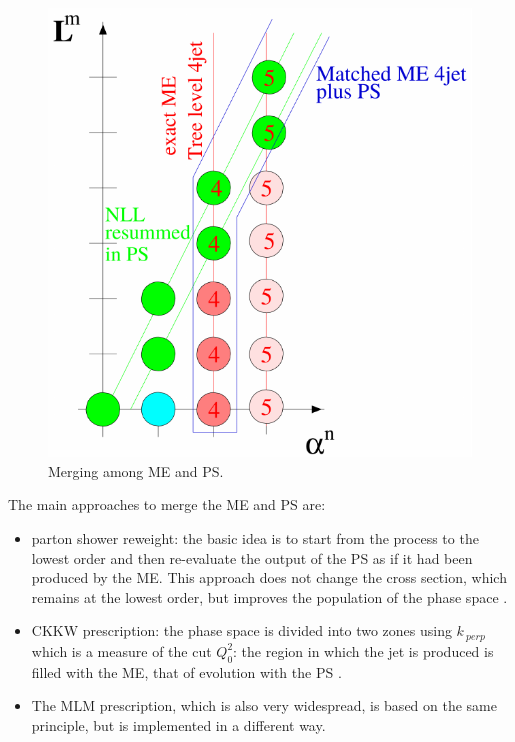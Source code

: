 \begin{figure}
\centering
\includegraphics[scale= 0.7]{../Cap3/Fig_MC/merge}
\caption{ Merging among ME and PS.}
\label{merge}
\end{figure}
The main approaches to merge the  ME and PS are:
\begin{itemize}
\item  parton shower reweight: the basic idea is to start from the process to the lowest order and then re-evaluate the output of the PS as if it had been produced by the ME. This approach does not change the cross section, which remains at the lowest order, but improves the population of the phase space \cite{ripesamento, ripesamento2}.
\item  CKKW prescription: the phase space is divided into two zones using $ k _ {\ perp} $ which is a measure of the cut $ Q_0 ^ 2 $: the region in which the jet is produced is filled with the ME, that of evolution with the PS \cite{ckkw, ckkw2}. 
\item The MLM prescription, which is also very widespread, is based on the same principle, but is implemented in a different way.
\end{itemize}


